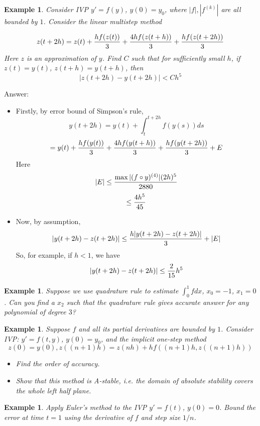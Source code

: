 \documentclass[20pt]{article} %
\theoremstyle{break}
\newtheorem{exa}[definition]{Example}
\begin{document}
\newpage

\begin{exa}Consider IVP $y'=f(y)$, $y(0)=y_0$, where $|f|, |f^{(k)}|$ are all bounded by $1$. Consider the linear multistep method

  \[z(t+2h)=z(t)+{hf(z(t))\over 3}+{4hf(z(t+h))\over 3}+{hf(z(t+2h))\over 3}\]
    Here $z$ is an approximation of $y$. Find $C$ such that for sufficiently small $h$, if $z(t)=y(t)$, $z(t+h)=y(t+h)$, then
    \[|z(t+2h)-y(t+2h)|<Ch^5\]
  \end{exa}

  Answer:
  \begin{itemize}
  \item Firstly, by error bound of Simpson's rule,
    \[y(t+2h)=y(t)+\int_t^{t+2h}f(y(s))ds\]
    \[=y(t)+{hf(y(t))\over 3}+{4hf(y(t+h))\over 3}+{hf(y(t+2h))\over 3}+E\]
    Here
    \[|E|\leq{\max|(f\circ y)^{(4)}|(2h)^5\over 2880}\]
    \[\leq {4h^5\over 45}\]
  \item Now, by assumption,
    \[|y(t+2h)-z(t+2h)|\leq {h|y(t+2h)-z(t+2h)|\over 3}+|E|\]
    So, for example, if $h<1$, we have
    \[|y(t+2h)-z(t+2h)|\leq {2\over 15}h^5\]
  \end{itemize}
  
\newpage

\begin{exa}Suppose we use quadrature rule to estimate $\int_0^1fdx$, $x_0=-1$, $x_1=0$. Can you find a $x_2$ such that the quadrature rule gives accurate answer for any polynomial of degree $3$?\end{exa}


\newpage

\begin{exa}Suppose $f$ and all its partial derivatives are bounded by $1$. Consider IVP: $y'=f(t, y)$, $y(0)=y_0$, and the implicit one-step method
  \[z(0)=y(0), z((n+1)h)=z(nh)+hf((n+1)h, z((n+1)h))\]
  \begin{itemize}
   \item Find the order of accuracy.
   \item Show that this method is A-stable, i.e. the domain of absolute stability covers the whole left half plane.
  \end{itemize}
\end{exa}

\newpage

\begin{exa}Apply Euler's method to the IVP $y'=f(t)$, $y(0)=0$. Bound the error at time $t=1$ using the derivative of $f$ and step size $1/n$.\end{exa}
\end{document}
